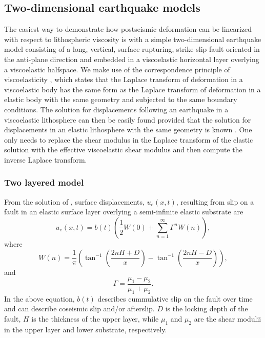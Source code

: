 \documentclass[fleqn,12pt]{article}
\begin{document}
\subsection{Two-dimensional earthquake models}
The easiest way to demonstrate how postseismic deformation can be
linearized with respect to lithospheric viscosity is with a simple
two-dimensional earthquake model consisting of a long, vertical,
surface rupturing, strike-slip fault oriented in the anti-plane
direction and embedded in a viscoelastic horizontal layer overlying a
viscoelastic halfspace.  We make use of the correspondence principle
of viscoelasticity \citep[e.g.][]{F1975}, which states that the
Laplace transform of deformation in a viscoelastic body has the same
form as the Laplace transform of deformation in a elastic body with
the same geometry and subjected to the same boundary conditions. The
solution for displacements following an earthquake in a viscoelastic
lithosphere can then be easily found provided that the solution for
displacements in an elastic lithosphere with the same geometry is known
\citep[e.g.][]{HH2005,NM1974,SP1978}.  One only needs to replace the
shear modulus in the Laplace transform of the elastic solution with
the effective viscoelastic shear modulus and then compute the inverse
Laplace transform.

\subsubsection{Two layered model}
From the solution of \citet{R1971}, surface displacements,
$u_{e}(x,t)$, resulting from slip on a fault in an elastic surface
layer overlying a semi-infinite elastic substrate are
\begin{equation}\label{TwoLayerElastic}
  u_{e}(x,t) = b(t)\left(\frac{1}{2} W(0) + 
    \sum_{n=1}^\infty \Gamma^nW(n)\right),
\end{equation}
where
\begin{equation}
  W(n) = \frac{1}{\pi}\left(\tan^{-1}\left(\frac{2nH + D}{x}\right) 
    - \tan^{-1}\left(\frac{2nH - D}{x}\right)\right),
\end{equation}
and
\begin{equation}
  \Gamma = \frac{\mu_1 - \mu_2}{\mu_1 + \mu_2}.
\end{equation}
In the above equation, $b(t)$ describes cummulative slip on the fault
over time and can describe coseismic slip and/or afterslip. $D$ is the
locking depth of the fault, $H$ is the thickness of the upper layer,
while $\mu_1$ and $\mu_2$ are the shear modulii in the upper layer and
lower substrate, respectively.
\end{document}
